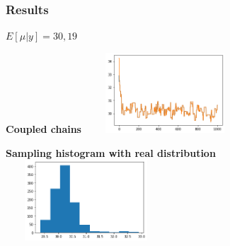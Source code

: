 \documentclass{beamer}
\begin{document}
\begin{frame}
	\frametitle{Results}
	$ E[\mu|y]=30,19 $
	\begin{center}
		\begin{minipage}{0.63\textwidth}
			\begin{center}
				{\scriptsize \textbf{Coupled chains}}
				\includegraphics[width=6cm,height=3cm]{immagini_mario/mu_chains}
			\end{center}
		\end{minipage}
		
		\vspace{0.2cm}
		
		\begin{minipage}{0.63\textwidth}
			\begin{center}
				{\scriptsize \textbf{Sampling histogram with real distribution}}
				\includegraphics[width=6cm,height=3cm]{immagini_mario/mu_hist}
			\end{center}
		\end{minipage}
	\end{center}
\end{frame}
\end{document}
